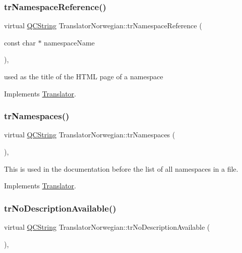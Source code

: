 \subsubsection{\texorpdfstring{trNamespaceReference()}{trNamespaceReference()}}
{\footnotesize\ttfamily virtual \mbox{\hyperlink{class_q_c_string}{Q\+C\+String}} Translator\+Norwegian\+::tr\+Namespace\+Reference (\begin{DoxyParamCaption}\item[{const char $\ast$}]{namespace\+Name }\end{DoxyParamCaption})\hspace{0.3cm}{\ttfamily [inline]}, {\ttfamily [virtual]}}

used as the title of the H\+T\+ML page of a namespace 

Implements \mbox{\hyperlink{class_translator}{Translator}}.

\mbox{\label{class_translator_norwegian_ab57d4f3c731565e70e9c669512608259}} 
\subsubsection{\texorpdfstring{trNamespaces()}{trNamespaces()}}
{\footnotesize\ttfamily virtual \mbox{\hyperlink{class_q_c_string}{Q\+C\+String}} Translator\+Norwegian\+::tr\+Namespaces (\begin{DoxyParamCaption}{ }\end{DoxyParamCaption})\hspace{0.3cm}{\ttfamily [inline]}, {\ttfamily [virtual]}}

This is used in the documentation before the list of all namespaces in a file. 

Implements \mbox{\hyperlink{class_translator}{Translator}}.

\mbox{\label{class_translator_norwegian_a69b521875e92a6d28d464f1899a45ed3}} 
\subsubsection{\texorpdfstring{trNoDescriptionAvailable()}{trNoDescriptionAvailable()}}
{\footnotesize\ttfamily virtual \mbox{\hyperlink{class_q_c_string}{Q\+C\+String}} Translator\+Norwegian\+::tr\+No\+Description\+Available (\begin{DoxyParamCaption}{ }\end{DoxyParamCaption})\hspace{0.3cm}{\ttfamily [inline]}, {\ttfamily [virtual]}}

